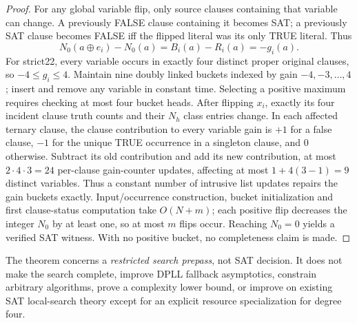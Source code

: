 \documentclass[10pt]{article}
\begin{document}
\begin{proof}
For any global variable flip, only source clauses containing that variable can change. A previously FALSE clause containing it becomes SAT; a previously SAT clause becomes FALSE iff the flipped literal was its only TRUE literal. Thus
\[N_0(a\oplus e_i)-N_0(a)=B_i(a)-R_i(a)=-g_i(a).\]
For strict22, every variable occurs in exactly four distinct proper original clauses, so $-4\le g_i\le4$. Maintain nine doubly linked buckets indexed by gain $-4,-3,\dots,4$; insert and remove any variable in constant time. Selecting a positive maximum requires checking at most four bucket heads. After flipping $x_i$, exactly its four incident clause truth counts and their $N_h$ class entries change. In each affected ternary clause, the clause contribution to every variable gain is $+1$ for a false clause, $-1$ for the unique TRUE occurrence in a singleton clause, and $0$ otherwise. Subtract its old contribution and add its new contribution, at most $2\cdot4\cdot3=24$ per-clause gain-counter updates, affecting at most $1+4(3-1)=9$ distinct variables. Thus a constant number of intrusive list updates repairs the gain buckets exactly. Input/occurrence construction, bucket initialization and first clause-status computation take $O(N+m)$; each positive flip decreases the integer $N_0$ by at least one, so at most $m$ flips occur. Reaching $N_0=0$ yields a verified SAT witness. With no positive bucket, no completeness claim is made.
\end{proof}
The theorem concerns a \emph{restricted search prepass}, not SAT decision. It does not make the search complete, improve DPLL fallback asymptotics, constrain arbitrary algorithms, prove a complexity lower bound, or improve on existing SAT local-search theory except for an explicit resource specialization for degree four.
\end{document}

